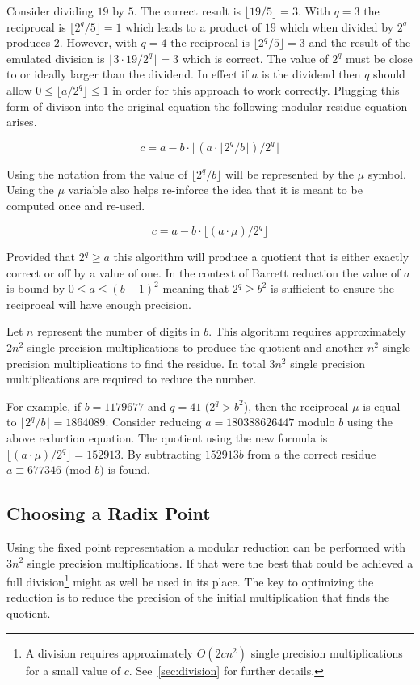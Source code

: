 \documentclass[b5paper]{book}
\begin{document}
Consider dividing $19$ by $5$.  The correct result is $\lfloor 19/5 \rfloor = 3$.  With $q = 3$ the reciprocal is $\lfloor 2^q/5 \rfloor = 1$ which
leads to a product of $19$ which when divided by $2^q$ produces $2$.  However, with $q = 4$ the reciprocal is $\lfloor 2^q/5 \rfloor = 3$ and
the result of the emulated division is $\lfloor 3 \cdot 19 / 2^q \rfloor = 3$ which is correct.  The value of $2^q$ must be close to or ideally
larger than the dividend.  In effect if $a$ is the dividend then $q$ should allow $0 \le \lfloor a/2^q \rfloor \le 1$ in order for this approach
to work correctly.  Plugging this form of divison into the original equation the following modular residue equation arises.

\begin{equation}
c = a - b \cdot \lfloor (a \cdot \lfloor 2^q / b \rfloor)/2^q \rfloor
\end{equation}

Using the notation from \cite{BARRETT} the value of $\lfloor 2^q / b \rfloor$ will be represented by the $\mu$ symbol.  Using the $\mu$
variable also helps re-inforce the idea that it is meant to be computed once and re-used.

\begin{equation}
c = a - b \cdot \lfloor (a \cdot \mu)/2^q \rfloor
\end{equation}

Provided that $2^q \ge a$ this algorithm will produce a quotient that is either exactly correct or off by a value of one.  In the context of Barrett
reduction the value of $a$ is bound by $0 \le a \le (b - 1)^2$ meaning that $2^q \ge b^2$ is sufficient to ensure the reciprocal will have enough
precision.  

Let $n$ represent the number of digits in $b$.  This algorithm requires approximately $2n^2$ single precision multiplications to produce the quotient and 
another $n^2$ single precision multiplications to find the residue.  In total $3n^2$ single precision multiplications are required to 
reduce the number.  

For example, if $b = 1179677$ and $q = 41$ ($2^q > b^2$), then the reciprocal $\mu$ is equal to $\lfloor 2^q / b \rfloor = 1864089$.  Consider reducing
$a = 180388626447$ modulo $b$ using the above reduction equation.  The quotient using the new formula is $\lfloor (a \cdot \mu) / 2^q \rfloor = 152913$.
By subtracting $152913b$ from $a$ the correct residue $a \equiv 677346 \mbox{ (mod }b\mbox{)}$ is found.

\subsection{Choosing a Radix Point}
Using the fixed point representation a modular reduction can be performed with $3n^2$ single precision multiplications.  If that were the best
that could be achieved a full division\footnote{A division requires approximately $O(2cn^2)$ single precision multiplications for a small value of $c$.  
See~\ref{sec:division} for further details.} might as well be used in its place.  The key to optimizing the reduction is to reduce the precision of
the initial multiplication that finds the quotient.  
\end{document}
